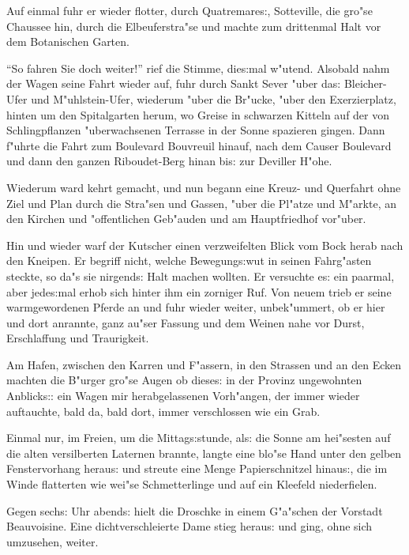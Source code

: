 \documentclass[oneside,12pt]{book}
\newcommand{\s}{s:}%
\begin{document}
Auf einmal fuhr er wieder flotter, durch Quatremare{\s},
Sotteville, die gro"se Chaussee hin, durch die Elbeuferstra"se und
machte zum drittenmal Halt vor dem Botanischen Garten.

"`So fahren Sie doch weiter!"' rief die Stimme, die{\s}mal
w"utend. Alsobald nahm der Wagen seine Fahrt wieder auf, fuhr
durch Sankt Sever "uber da{\s} Bleicher-Ufer und M"uhlstein-Ufer,
wiederum "uber die Br"ucke, "uber den Exerzierplatz, hinten um den
Spitalgarten herum, wo Greise in schwarzen Kitteln auf der von
Schlingpflanzen "uberwachsenen Terrasse in der Sonne spazieren
gingen. Dann f"uhrte die Fahrt zum Boulevard Bouvreuil hinauf,
nach dem Causer Boulevard und dann den ganzen Riboudet-Berg hinan
bi{\s} zur Deviller H"ohe.

Wiederum ward kehrt gemacht, und nun begann eine Kreuz- und
Querfahrt ohne Ziel und Plan durch die Stra"sen und Gassen, "uber
die Pl"atze und M"arkte, an den Kirchen und "offentlichen
Geb"auden und am Hauptfriedhof vor"uber.

Hin und wieder warf der Kutscher einen verzweifelten Blick vom
Bock herab nach den Kneipen. Er begriff nicht, welche
Bewegung{\s}wut in seinen Fahrg"asten steckte, so da"s sie
nirgend{\s} Halt machen wollten. Er versuchte e{\s} ein paarmal,
aber jede{\s}mal erhob sich hinter ihm ein zorniger Ruf. Von neuem
trieb er seine warmgewordenen Pferde an und fuhr wieder weiter,
unbek"ummert, ob er hier und dort anrannte, ganz au"ser Fassung
und dem Weinen nahe vor Durst, Erschlaffung und Traurigkeit.

Am Hafen, zwischen den Karren und F"assern, in den Strassen und an
den Ecken machten die B"urger gro"se Augen ob diese{\s} in der
Provinz ungewohnten Anblick{\s}: ein Wagen mir herabgelassenen
Vorh"angen, der immer wieder auftauchte, bald da, bald dort, immer
verschlossen wie ein Grab.

Einmal nur, im Freien, um die Mittag{\s}stunde, al{\s} die Sonne
am hei"sesten auf die alten versilberten Laternen brannte, langte
eine blo"se Hand unter den gelben Fenstervorhang herau{\s} und
streute eine Menge Papierschnitzel hinau{\s}, die im Winde
flatterten wie wei"se Schmetterlinge und auf ein Kleefeld
niederfielen.

Gegen sech{\s} Uhr abend{\s} hielt die Droschke in einem G"a"schen
der Vorstadt Beauvoisine. Eine dichtverschleierte Dame stieg
herau{\s} und ging, ohne sich umzusehen, weiter.


\newpage\begin{center}
{\large \so{Zweite{\s} Kapitel}}\bigskip\bigskip
\end{center}
\end{document}
